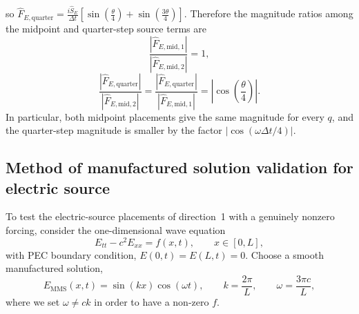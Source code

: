 \documentclass{article}
\numberwithin{figure}{section}
\begin{document}
so $\widehat{F}_{E,\mathrm{quarter}}=\frac{i\widehat{S}_E}{\Delta t}\left[\sin\left(\frac{\theta}{4}\right)+\sin\left(\frac{3\theta}{4}\right)\right]$.
Therefore the magnitude ratios among the midpoint and quarter-step source terms are
\begin{equation}
    \frac{\left|\widehat{F}_{E,\mathrm{mid,1}}\right|}{\left|\widehat{F}_{E,\mathrm{mid,2}}\right|}=1, \label{eq:dir2-source-magnitude-ratio-mid}
\end{equation}
\begin{equation}
    \frac{\left|\widehat{F}_{E,\mathrm{quarter}}\right|}{\left|\widehat{F}_{E,\mathrm{mid,2}}\right|}=\frac{\left|\widehat{F}_{E,\mathrm{quarter}}\right|}{\left|\widehat{F}_{E,\mathrm{mid,1}}\right|}=\left|\cos\left(\frac{\theta}{4}\right)\right|. \label{eq:dir2-source-magnitude-ratio}
\end{equation}
In particular, both midpoint placements give the same magnitude for every $q$, and the quarter-step magnitude is smaller by the factor $\lvert\cos(\omega\Delta t/4)\rvert$.

\subsection{Method of manufactured solution validation for electric source}

To test the electric-source placements of direction~1 with a genuinely nonzero forcing, consider the one-dimensional wave equation
\begin{equation}
    E_{tt}-c^2 E_{xx}=f(x,t),\qquad x\in[0,L],
    \label{eq:mms-wave-equation}
\end{equation}
with PEC boundary condition, $E(0,t)=E(L,t)=0$. Choose a smooth manufactured solution,
\begin{equation}
    E_{\mathrm{MMS}}(x,t)=\sin(kx)\cos(\omega t),\qquad
    k=\frac{2\pi}{L},\qquad
    \omega=\frac{3\pi c}{L},
    \label{eq:mms-solution}
\end{equation}
where we set $\omega \neq c k$ in order to have a non-zero $f$.
\end{document}
